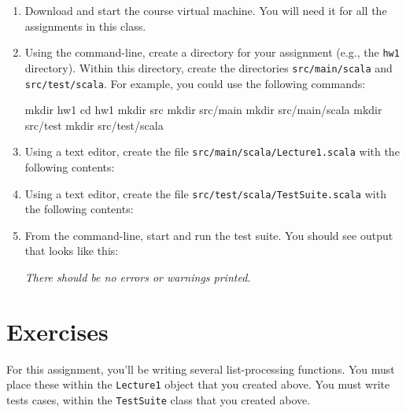 \documentclass{book}
\begin{document}
\begin{enumerate}

\item Download and start the course virtual machine. You will need it for all
the assignments in this class.

\item Using the command-line, create a directory for your assignment (e.g., the
  \verb|hw1| directory). Within this directory, create the directories
  \verb|src/main/scala| and \verb|src/test/scala|. For example, you could use
  the following commands:
  \begin{console}
  mkdir hw1
  cd hw1
  mkdir src
  mkdir src/main
  mkdir src/main/scala
  mkdir src/test
  mkdir src/test/scala
  \end{console}

   \item Using a text editor, create the file \verb|src/main/scala/Lecture1.scala|
   with the following contents:

   \item Using a text editor, create the file \verb|src/test/scala/TestSuite.scala|
   with the following contents:

  \item From the command-line, start \sbt{} and run the test suite. You should
  see output that looks like this:

  

  \noindent \emph{There should be no errors or warnings printed.}

\end{enumerate}

\section{Exercises}

For this assignment, you'll be writing several list-processing
functions. You must place these within the \verb|Lecture1| object that
you created above. You must write tests cases, within the \verb|TestSuite|
class that you created above.
\end{document}
